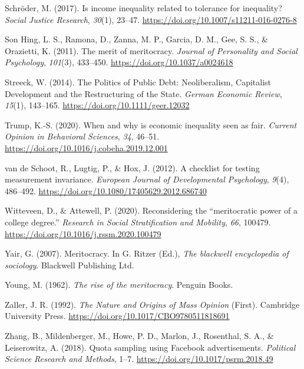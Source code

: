 \documentclass[
  10pt,
  a4paper,
]{article}
\newlength{\cslhangindent}
\newenvironment{CSLReferences}[2] %
 {\begin{list}{}{%
  \setlength{\itemindent}{0pt}
  \setlength{\leftmargin}{0pt}
  \setlength{\parsep}{0pt}
  \ifodd #1
   \setlength{\leftmargin}{\cslhangindent}
   \setlength{\itemindent}{-1\cslhangindent}
  \fi
  \setlength{\itemsep}{#2\baselineskip}}}
 {\end{list}}
\begin{document}
\begin{CSLReferences}{1}{0}
Schröder, M. (2017). Is income inequality related to tolerance for inequality? \emph{Social Justice Research}, \emph{30}(1), 23--47. \url{https://doi.org/10.1007/s11211-016-0276-8}

Son Hing, L. S., Ramona, D., Zanna, M. P., Garcia, D. M., Gee, S. S., \& Orazietti, K. (2011). The merit of meritocracy. \emph{Journal of Personality and Social Psychology}, \emph{101}(3), 433--450. \url{https://doi.org/10.1037/a0024618}

Streeck, W. (2014). The {Politics} of {Public Debt}: {Neoliberalism}, {Capitalist Development} and the {Restructuring} of the {State}. \emph{German Economic Review}, \emph{15}(1), 143--165. \url{https://doi.org/10.1111/geer.12032}

Trump, K.-S. (2020). When and why is economic inequality seen as fair. \emph{Current Opinion in Behavioral Sciences}, \emph{34}, 46--51. \url{https://doi.org/10.1016/j.cobeha.2019.12.001}

van de Schoot, R., Lugtig, P., \& Hox, J. (2012). A checklist for testing measurement invariance. \emph{European Journal of Developmental Psychology}, \emph{9}(4), 486--492. \url{https://doi.org/10.1080/17405629.2012.686740}

Witteveen, D., \& Attewell, P. (2020). Reconsidering the {``meritocratic power of a college degree.''} \emph{Research in Social Stratification and Mobility}, \emph{66}, 100479. \url{https://doi.org/10.1016/j.rssm.2020.100479}

Yair, G. (2007). Meritocracy. In G. Ritzer (Ed.), \emph{The blackwell encyclopedia of sociology}. {Blackwell Publishing Ltd}.

Young, M. (1962). \emph{The rise of the meritocracy}. {Penguin Books}.

Zaller, J. R. (1992). \emph{The {Nature} and {Origins} of {Mass Opinion}} (First). {Cambridge University Press}. \url{https://doi.org/10.1017/CBO9780511818691}

Zhang, B., Mildenberger, M., Howe, P. D., Marlon, J., Rosenthal, S. A., \& Leiserowitz, A. (2018). Quota sampling using {Facebook} advertisements. \emph{Political Science Research and Methods}, 1--7. \url{https://doi.org/10.1017/psrm.2018.49}

\end{CSLReferences}
\end{document}
